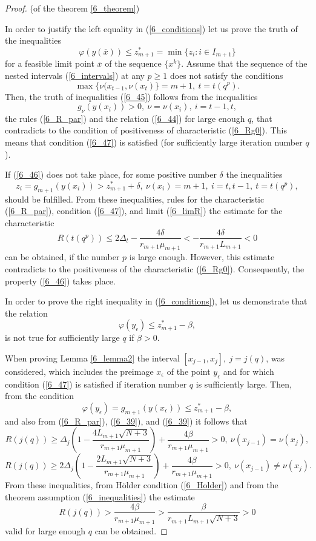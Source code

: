 \begin{proof} (of the theorem \ref{6_theorem})

In order to justify the left equality in (\ref{6_conditions}) let us prove the truth of the inequalities 
	\begin{equation}\label{6_46}
	\varphi(y(\overline{x})) \leq z_{m+1}^\ast=\min\{z_i:i\in I_{m+1} \}
	\end{equation}
for a feasible limit point $\overline{x}$ of the sequence $\{x^k\}$. Assume that the sequence of the nested intervals (\ref{6_intervals}) at any $p \geq 1$ does not satisfy the conditions
	\begin{equation}\label{6_47}
	\max \{\nu(x_{t-1},\nu(x_t)\}=m+1,\ t=t(q^p).
	\end{equation}
Then, the truth of inequalities (\ref{6_45}) follows from the inequalities 
\[
g_\nu(y(x_i))>0,\ \nu = \nu(x_i),\ i=t-1,t,
\]
the rules (\ref{6_R_par}) and the relation (\ref{6_44}) for large enough $q$, that contradicts to the condition of positiveness of characteristic (\ref{6_Rg0}). This means that condition (\ref{6_47}) is satisfied (for sufficiently large iteration number $q$).

If (\ref{6_46}) does not take place, for some positive number $\delta$ the inequalities 
\[
z_i=g_{m+1}(y(x_i)) > z_{m+1}^\ast + \delta,\ \nu(x_i)=m+1,\ i=t,t-1,\ t=t(q^p),
\]
should be fulfilled. From these inequalities, rules for the characteristic (\ref{6_R_par}), condition (\ref{6_47}), and limit (\ref{6_limR}) the estimate for the characteristic 
\[
R(t(q^p))\leq 2\Delta_t - \frac{4\delta}{r_{m+1}\mu_{m+1}}<-\frac{4\delta}{r_{m+1}L_{m+1}} < 0 
\]
can be obtained, if the number $p$ is large enough. However, this estimate contradicts to the positiveness of the characteristic (\ref{6_Rg0}). Consequently, the property (\ref{6_46}) takes place.

In order to prove the right inequality in (\ref{6_conditions}), let us demonstrate that the relation
\[
\varphi (y_\epsilon) \leq z_{m+1}^\ast - \beta,
\]
is not true for sufficiently large $q$ if $\beta>0$.

When proving Lemma \ref{6_lemma2} the interval  $[x_{j-1},x_j],\ j=j(q)$, was considered, which includes the preimage $x_\epsilon$ of the point $y_\epsilon$ and for which condition (\ref{6_47}) is satisfied if iteration number $q$ is sufficiently large. Then, from the condition 
\[
\varphi (y_\epsilon) = g_{m+1}(y(x_\epsilon)) \leq z_{m+1}^\ast - \beta,
\]
and also from (\ref{6_R_par}), (\ref{6_39}), and (\ref{6_39}) it follows that
\[
R(j(q)) \geq \Delta_j \left(1-\frac{4L_{m+1}\sqrt{N+3}}{r_{m+1}\mu_{m+1}}\right) + \frac{4\beta}{r_{m+1}\mu_{m+1}}>0, \ \nu(x_{j-1})=\nu(x_j),
\]
\[
R(j(q)) \geq 2\Delta_j \left(1-\frac{2L_{m+1}\sqrt{N+3}}{r_{m+1}\mu_{m+1}}\right) + \frac{4\beta}{r_{m+1}\mu_{m+1}}>0, \ \nu(x_{j-1}) \neq \nu(x_j).
\]
From these inequalities, from H\"older condition (\ref{6_Holder}) and from the theorem assumption (\ref{6_inequalities}) the estimate 
\[
R(j(q)) > \frac{4\beta}{r_{m+1}\mu_{m+1}} > \frac{\beta}{r_{m+1}L_{m+1}\sqrt{N+3}} > 0 
\]
valid for large enough $q$ can be obtained.


\end{proof}
